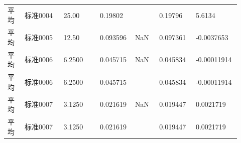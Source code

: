 \documentclass[UTF8,10pt,a4paper,fontset=fandol]{ctexart}
\newcommand{\fieldvalue}[1]{#1}
\begin{document}
\begin{tabular}{p{0.07\linewidth}p{0.16\linewidth}p{0.15\linewidth}p{0.14\linewidth}p{0.10\linewidth}p{0.15\linewidth}p{0.15\linewidth}}
平均 &
\fieldvalue{标准0004} &
\fieldvalue{25.00} &
\fieldvalue{0.19802} &
&
\fieldvalue{0.19796} &
\fieldvalue{5.6134\mathrm{E}{-005}} \\

平均 &
\fieldvalue{标准0005} &
\fieldvalue{12.50} &
\fieldvalue{0.093596} &
\fieldvalue{NaN} &
\fieldvalue{0.097361} &
\fieldvalue{-0.0037653} \\

平均 &
\fieldvalue{标准0006} &
\fieldvalue{6.2500} &
\fieldvalue{0.045715} &
\fieldvalue{NaN} &
\fieldvalue{0.045834} &
\fieldvalue{-0.00011914} \\

平均 &
\fieldvalue{标准0006} &
\fieldvalue{6.2500} &
\fieldvalue{0.045715} &
&
\fieldvalue{0.045834} &
\fieldvalue{-0.00011914} \\

平均 &
\fieldvalue{标准0007} &
\fieldvalue{3.1250} &
\fieldvalue{0.021619} &
\fieldvalue{NaN} &
\fieldvalue{0.019447} &
\fieldvalue{0.0021719} \\

平均 &
\fieldvalue{标准0007} &
\fieldvalue{3.1250} &
\fieldvalue{0.021619} &
&
\fieldvalue{0.019447} &
\fieldvalue{0.0021719}
\end{tabular}
\normalsize
\end{document}
